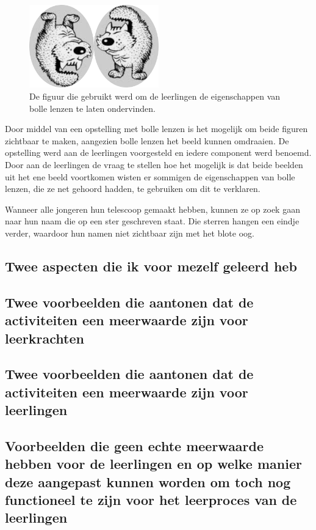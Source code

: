 \documentclass[a4paper,12pt,twoside]{article}%
\begin{document}
\begin{figure}[!b]
	\centering
	\includegraphics[width=0.5\textwidth]{HondKat}
	\caption{De figuur die gebruikt werd om de  leerlingen de eigenschappen van bolle lenzen te laten ondervinden.}
	\label{Fig::HondKat}
\end{figure}
Door middel van een opstelling met bolle lenzen is het mogelijk om beide figuren zichtbaar te maken, aangezien bolle lenzen het beeld kunnen omdraaien. De opstelling werd aan de leerlingen voorgesteld en iedere component werd benoemd. Door aan de  leerlingen de vraag te stellen hoe het mogelijk is dat beide beelden uit het ene beeld voortkomen wisten er sommigen de eigenschappen van bolle lenzen, die ze net gehoord hadden, te gebruiken om dit te verklaren. 

Wanneer alle jongeren hun telescoop gemaakt hebben, kunnen ze op zoek gaan naar hun naam die op een ster geschreven staat. Die sterren hangen een eindje verder, waardoor hun namen niet zichtbaar zijn met het blote oog. 

\subsection{Twee aspecten die ik voor mezelf geleerd heb}

\subsection{Twee voorbeelden die aantonen dat de activiteiten een meerwaarde zijn voor leerkrachten}

\subsection{Twee voorbeelden die aantonen dat de activiteiten een meerwaarde zijn voor leerlingen}


\subsection{Voorbeelden die geen echte meerwaarde hebben voor de  leerlingen en op welke manier deze aangepast kunnen worden om toch nog functioneel te zijn voor het leerproces van de leerlingen}
\end{document}
